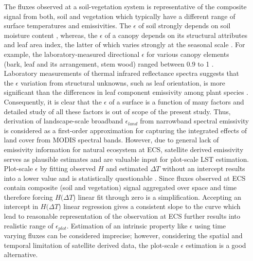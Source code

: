 \documentclass[fleqn,10pt]{wlscirep}
\begin{document}
{The fluxes observed at a soil-vegetation system is representative of the composite signal from both, soil and vegetation which typically have a different range of surface temperatures and emissivities\cite{jin_improved_2006-1}. The $\epsilon$ of soil strongly depends on soil moisture content \cite{mira2007influence}, whereas, the $\epsilon$ of a canopy depends on its structural attributes and leaf area index, the latter of which varies strongly at the seasonal scale \cite{chen2015determining}. For example, the laboratory-measured directional $\epsilon$ for various canopy elements (bark, leaf and its arrangement, stem wood) ranged between 0.9 to 1 \cite{vishnevetsky2019method}. %
Laboratory measurements of thermal infrared reflectance spectra suggests that the $\epsilon$ variation from structural unknowns, such as leaf orientation, is more significant than the differences in leaf component emissivity among plant species \cite{snyder1998classification}. Consequently, it is clear that the $\epsilon$ of a surface is a function of many factors and detailed study of all these factors is out of scope of the present study. Thus, derivation of landscape-scale broadband $\epsilon_{land}$ from narrowband spectral emissivity is considered as a first-order approximation for capturing the integrated effects of land cover from MODIS spectral bands\cite{jin_improved_2006-1}. However, due to general lack of emissivity information for natural ecosystem at ECS, satellite derived emissivity serves as plausible estimates and are valuable input for plot-scale LST estimation. Plot-scale $\epsilon$ by fitting observed $H$ and estimated $\Delta T$ without an intercept results into a lower value and is statistically questionable \cite{eisenhauer2003regression}. Since fluxes observed at ECS contain composite (soil and vegetation) signal aggregated over space and time therefore forcing $H(\Delta T$) linear fit through zero is a simplification. Accepting an intercept in $H(\Delta T$) linear regression gives a consistent slope to the curve which lead to reasonable representation of the observation at ECS further results into realistic range of $\epsilon_{plot}$. Estimation of an intrinsic property like $\epsilon$ using time varying fluxes can be considered imprecise; however, considering the spatial and temporal limitation of satellite derived data, the plot-scale $\epsilon$ estimation is a good alternative.

}
\end{document}
